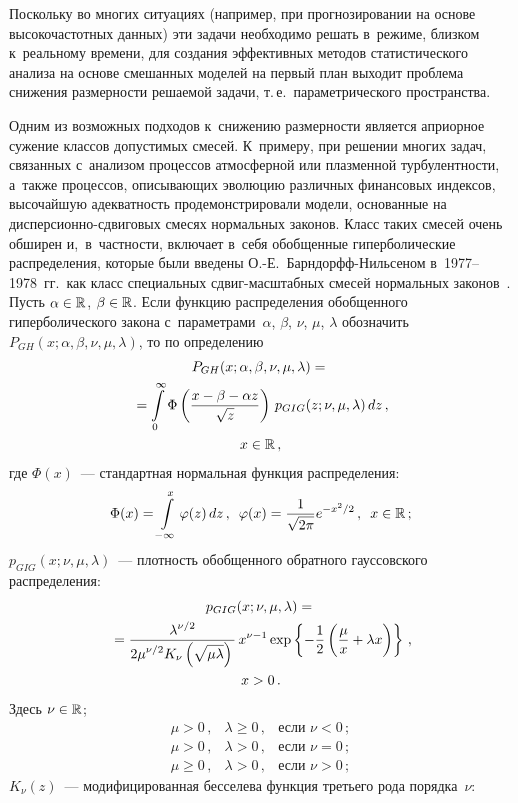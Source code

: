 \begin{multicols}{2}
Поскольку во многих ситуациях (например,
при прогнозировании на основе высокочастотных данных) эти задачи
необходимо решать в~режиме, близком к~реальному времени, для
создания эффективных методов статистического анализа на основе
смешанных моделей на первый план выходит проб\-ле\-ма снижения
размерности решаемой задачи, т.\,е.\ параметрического пространства.

Одним из возможных подходов к~снижению размерности является
априорное сужение классов допусти\-мых смесей. К~примеру, при решении
многих задач, связанных с~анализом процессов атмосферной или
плазменной турбулентности, а~так\-же процессов, описывающих эволюцию
различных финансовых индексов, высочайшую адекватность
продемонстрировали модели, основанные на дис\-пер\-си\-он\-но-сдви\-го\-вых
смесях нормальных законов. Класс таких смесей очень обширен
и,~в~част\-ности, включает в~себя обобщенные гиперболические распределения,
которые были введены О.-Е.~Барн\-дорфф-Ниль\-се\-ном в~1977--1978~гг.\ как
класс специальных сдвиг-мас\-штаб\-ных смесей нормальных законов~\cite{BN1977, BN1978}.
Пусть $\alpha\hm\in\r$, $\beta\hm\in\r$. Если
функцию распределения обобщенного гиперболического закона
с~параметрами~$\alpha$, $\beta$, $\nu$, $\mu$, $\lambda$ обозначить
$P_{GH}(x;\alpha,\beta,\nu,\mu,\lambda)$, то по определению
\begin{multline}
P_{GH}(x;\alpha,\beta,\nu,\mu,\lambda)={}\\
{}=
\int\limits_{0}^{\infty}\Phi\left(\displaystyle\frac{\displaystyle x-\beta-\alpha
z\mathstrut}{\displaystyle \sqrt{z}\mathstrut}\right)\,p_{GIG}(z;\nu,\mu,\lambda)\,dz\,,\\
x\in\mathbb{R}\,,
\label{e1-kor}
\end{multline}
где $\Phi(x)$~--- стандартная нормальная функция распределения:
$$
\Phi(x)=\int\limits_{-\infty}^{x}\varphi(z)\,dz\,,\enskip
\varphi(x)=\displaystyle\frac{\displaystyle 1\mathstrut}{\displaystyle \sqrt{2\pi}\mathstrut}e^{-x^2/2}\,,\enskip  x\in\mathbb{R}\,;
$$
$p_{GIG}(x;\nu,\mu,\lambda)$~--- плот\-ность обобщенного обратного
гауссовского распределения:
\begin{multline*}
p_{GIG}(x;\nu,\mu,\lambda)={}\\
{}=\displaystyle\frac{\displaystyle \lambda^{\nu/2}\mathstrut}{\displaystyle 2\mu^{\nu/2}
K_{\nu}\left(\sqrt{\mu\lambda}\right)\mathstrut}\,
x^{\nu-1}\exp\left\{-\displaystyle\frac{\displaystyle 1\mathstrut}{\displaystyle 2\mathstrut}\left(\displaystyle\frac{\displaystyle \mu\mathstrut}{\displaystyle x\mathstrut}+\lambda
x\right)\right\}\,,\\ x>0\,.
\end{multline*}
Здесь $\nu\in\mathbb{R}$;
$$
\begin{array}{lll}
\mu>0\,, & \lambda\geqslant0\,, & \mbox{если }\nu<0\,;\\[6pt]
\mu>0\,, & \lambda>0\,, & \mbox{если }\nu=0\,;\\[6pt]
\mu\geqslant0\,, & \lambda>0\,, & \mbox{если }\nu>0\,;
\end{array}
$$
$K_{\nu}(z)$~--- модифицированная бесселева функция третьего рода
порядка~$\nu$:


\end{multicols}
